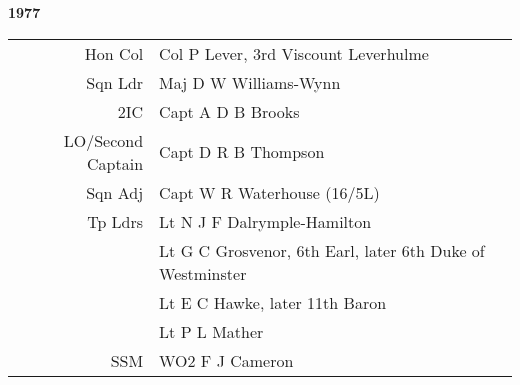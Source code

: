 \begin{center}
  \Huge
  \textbf{1977}
\end{center}

\begin{center}
  \small
  \begin{tabular}{rl}
    Hon Col & Col P Lever, 3rd Viscount Leverhulme \\
    Sqn Ldr & Maj D W Williams-Wynn \\
    2IC & Capt A D B Brooks \\
    LO/Second Captain & Capt D R B Thompson \\
    Sqn Adj & Capt W R Waterhouse (16/5L) \\
    Tp Ldrs & Lt N J F Dalrymple-Hamilton \\
      & Lt G C Grosvenor, 6th Earl, later 6th Duke of Westminster \\
      & Lt E C Hawke, later 11th Baron \\
      & Lt P L Mather \\
    SSM & WO2 F J Cameron \\
  \end{tabular}
\end{center}

